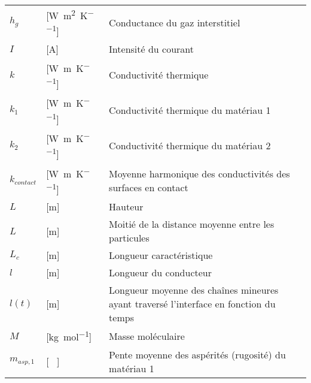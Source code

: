 \begin{longtable}{l p{2.5cm} p{4in}}
	$h_g$             & [\si{\watt\per\square\metre\per\kelvin}]            & Conductance du gaz interstitiel                                                       \\
	$I$               & [\si{\ampere}]                                      & Intensité du courant                                                                  \\
	$k$               & [\si{\watt\per\metre\per\kelvin}]                   & Conductivité thermique                                                                \\
	$k_1$             & [\si{\watt\per\metre\per\kelvin}]                   & Conductivité thermique du matériau 1                                                  \\
	$k_2$             & [\si{\watt\per\metre\per\kelvin}]                   & Conductivité thermique du matériau 2                                                  \\
	$k_{contact}$     & [\si{\watt\per\metre\per\kelvin}]                   & Moyenne harmonique des conductivités des surfaces en contact                          \\
	$L$               & [\si{\metre}]                                       & Hauteur                                                                               \\
	$L$               & [\si{\metre}]                                       & Moitié de la distance moyenne entre les particules                                    \\
	$L_c$             & [\si{\metre}]                                       & Longueur caractéristique                                                              \\
	$l$               & [\si{\metre}]                                       & Longueur du conducteur                                                                \\
	$l(t)$            & [\si{\metre}]                                       & Longueur moyenne des chaînes mineures ayant traversé l'interface en fonction du temps \\
	$M$               & [\si{\kilogram\per\mole}]                           & Masse moléculaire                                                                     \\
	$m_{asp,1}$       & [ \ ]                                               & Pente moyenne des aspérités (rugosité) du matériau 1                                  \\

\end{longtable}
